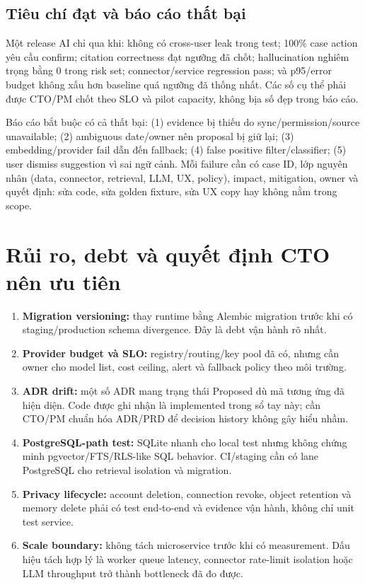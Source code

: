 \documentclass[11pt,a4paper]{article}
\newcommand{\code}[1]{\texttt{\detokenize{#1}}}
\begin{document}
\subsection{Tiêu chí đạt và báo cáo thất bại}

Một release AI chỉ qua khi: không có cross-user leak trong test; 100\% case action yêu cầu confirm; citation correctness đạt ngưỡng đã chốt; hallucination nghiêm trọng bằng 0 trong risk set; connector/service regression pass; và p95/error budget không xấu hơn baseline quá ngưỡng đã thống nhất. Các số cụ thể phải được CTO/PM chốt theo SLO và pilot capacity, không bịa số đẹp trong báo cáo.

Báo cáo bắt buộc có cả thất bại: (1) evidence bị thiếu do sync/permission/source unavailable; (2) ambiguous date/owner nên proposal bị giữ lại; (3) embedding/provider fail dẫn đến fallback; (4) false positive filter/classifier; (5) user dismiss suggestion vì sai ngữ cảnh. Mỗi failure cần có case ID, lớp nguyên nhân (data, connector, retrieval, LLM, UX, policy), impact, mitigation, owner và quyết định: sửa code, sửa golden fixture, sửa UX copy hay không nằm trong scope.

\section{Rủi ro, debt và quyết định CTO nên ưu tiên}

\begin{enumerate}
  \item \textbf{Migration versioning:} thay \code{create_all} runtime bằng Alembic migration trước khi có staging/production schema divergence. Đây là debt vận hành rõ nhất.
  \item \textbf{Provider budget và SLO:} registry/routing/key pool đã có, nhưng cần owner cho model list, cost ceiling, alert và fallback policy theo môi trường.
  \item \textbf{ADR drift:} một số ADR mang trạng thái Proposed dù mã tương ứng đã hiện diện. Code được ghi nhận là implemented trong sổ tay này; cần CTO/PM chuẩn hóa ADR/PRD để decision history không gây hiểu nhầm.
  \item \textbf{PostgreSQL-path test:} SQLite nhanh cho local test nhưng không chứng minh pgvector/FTS/RLS-like SQL behavior. CI/staging cần có lane PostgreSQL cho retrieval isolation và migration.
  \item \textbf{Privacy lifecycle:} account deletion, connection revoke, object retention và memory delete phải có test end-to-end và evidence vận hành, không chỉ unit test service.
  \item \textbf{Scale boundary:} không tách microservice trước khi có measurement. Dấu hiệu tách hợp lý là worker queue latency, connector rate-limit isolation hoặc LLM throughput trở thành bottleneck đã đo được.
\end{enumerate}
\end{document}

